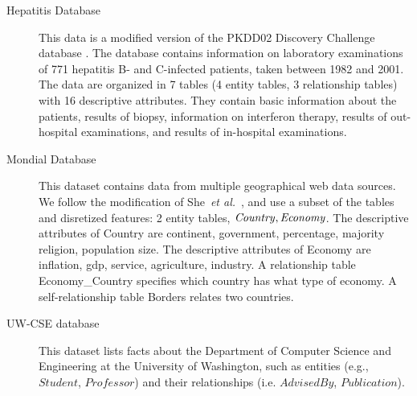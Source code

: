 \documentclass[twoside,11pt]{article}
\newcommand{\etal}{\textit{et al.}}
\begin{document}
\begin{description}
\item[Hepatitis Database] This data is a modified version of the PKDD02 Discovery Challenge database \cite{Frank2007}. %
The database contains information on laboratory examinations of 771 hepatitis B- and C-infected patients, taken
between 1982 and 2001. The data are organized in 7 tables (4 entity tables,  3 relationship tables) with 16 descriptive attributes. They contain basic information about the patients, results of biopsy, information on interferon therapy, results of out-hospital examinations, and results of in-hospital examinations. 

\item[Mondial Database] 
%
%
This dataset contains data from multiple geographical web data sources. 
We follow the modification of She~\etal~\cite{wangMondial}, and use a subset of the tables and disretized features: 2 entity tables, $\it{Country},\it{Economy}$. The descriptive attributes of Country are continent, government, percentage, majority religion, population size. The descriptive attributes of Economy are inflation, gdp, service, agriculture, industry. A relationship table Economy\_Country specifies which country has what type of economy. A self-relationship table Borders relates two countries.



\item[UW-CSE database] This dataset lists facts about the Department of Computer Science and Engineering at the University of Washington, such as entities (e.g., $Student$, $Professor$) and their relationships (i.e. $AdvisedBy$, $Publication$).

\end{description}
\end{document}
